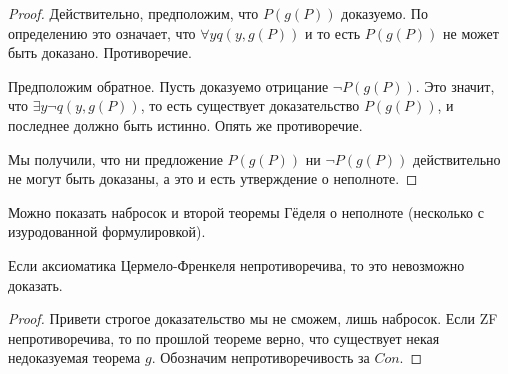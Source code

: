 \begin{proof}
Действительно, предположим, что $P(g(P))$ доказуемо. По определению это означает, что $\forall y q(y, g(P))$ и то есть $P(g(P))$ не может быть доказано. Противоречие.

Предположим обратное. Пусть доказуемо отрицание $\neg P(g(P))$. Это значит, что $\exists y \neg q(y, g(P))$, то есть существует доказательство $P(g(P))$, и последнее должно быть истинно. Опять же противоречие.

Мы получили, что ни предложение $P(g(P))$ ни $\neg P(g(P))$ действительно не могут быть доказаны, а это и есть утверждение о неполноте.
\end{proof}

Можно показать набросок и второй теоремы Гёделя о неполноте (несколько с изуродованной формулировкой).

\begin{thm}
Если аксиоматика Цермело-Френкеля непротиворечива, то это невозможно доказать.
\end{thm}
\begin{proof}
Привети строгое доказательство мы не сможем, лишь набросок. Если ZF непротиворечива, то по прошлой теореме верно, что существует некая недоказуемая теорема $g$. Обозначим непротиворечивость за $Con$.
\end{proof}